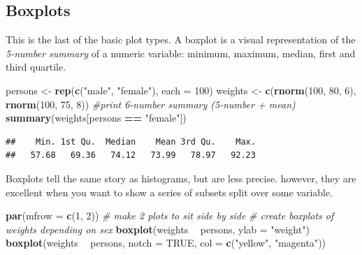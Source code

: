 \documentclass[]{book}
\newenvironment{Shaded}{\begin{snugshade}}{\end{snugshade}}
\newcommand{\CommentTok}[1]{\textcolor[rgb]{0.56,0.35,0.01}{\textit{#1}}}
\newcommand{\DataTypeTok}[1]{\textcolor[rgb]{0.13,0.29,0.53}{#1}}
\newcommand{\DecValTok}[1]{\textcolor[rgb]{0.00,0.00,0.81}{#1}}
\newcommand{\KeywordTok}[1]{\textcolor[rgb]{0.13,0.29,0.53}{\textbf{#1}}}
\newcommand{\NormalTok}[1]{#1}
\newcommand{\OperatorTok}[1]{\textcolor[rgb]{0.81,0.36,0.00}{\textbf{#1}}}
\newcommand{\OtherTok}[1]{\textcolor[rgb]{0.56,0.35,0.01}{#1}}
\newcommand{\StringTok}[1]{\textcolor[rgb]{0.31,0.60,0.02}{#1}}
\begin{document}
\hypertarget{boxplots}{%
\subsection{Boxplots}\label{boxplots}}

This is the last of the basic plot types. A boxplot is a visual representation of the \emph{5-number summary} of a numeric variable: minimum, maximum, median, first and third quartile.

\begin{Shaded}
\begin{Highlighting}[]
\NormalTok{persons <-}\StringTok{ }\KeywordTok{rep}\NormalTok{(}\KeywordTok{c}\NormalTok{(}\StringTok{"male"}\NormalTok{, }\StringTok{"female"}\NormalTok{), }\DataTypeTok{each =} \DecValTok{100}\NormalTok{)}
\NormalTok{weights <-}\StringTok{ }\KeywordTok{c}\NormalTok{(}\KeywordTok{rnorm}\NormalTok{(}\DecValTok{100}\NormalTok{, }\DecValTok{80}\NormalTok{, }\DecValTok{6}\NormalTok{), }\KeywordTok{rnorm}\NormalTok{(}\DecValTok{100}\NormalTok{, }\DecValTok{75}\NormalTok{, }\DecValTok{8}\NormalTok{))}
\CommentTok{#print 6-number summary (5-number + mean)}
\KeywordTok{summary}\NormalTok{(weights[persons }\OperatorTok{==}\StringTok{ "female"}\NormalTok{])}
\end{Highlighting}
\end{Shaded}

\begin{verbatim}
##    Min. 1st Qu.  Median    Mean 3rd Qu.    Max. 
##   57.68   69.36   74.12   73.99   78.97   92.23
\end{verbatim}

Boxplots tell the same story as histograms, but are less precise. however, they are excellent when you want to show a series of subsets split over some variable.

\begin{Shaded}
\begin{Highlighting}[]
\KeywordTok{par}\NormalTok{(}\DataTypeTok{mfrow =} \KeywordTok{c}\NormalTok{(}\DecValTok{1}\NormalTok{, }\DecValTok{2}\NormalTok{)) }\CommentTok{# make 2 plots to sit side by side}
\CommentTok{# create boxplots of weights depending on sex}
\KeywordTok{boxplot}\NormalTok{(weights }\OperatorTok{~}\StringTok{ }\NormalTok{persons, }\DataTypeTok{ylab =} \StringTok{"weight"}\NormalTok{)}
\KeywordTok{boxplot}\NormalTok{(weights }\OperatorTok{~}\StringTok{ }\NormalTok{persons, }\DataTypeTok{notch =} \OtherTok{TRUE}\NormalTok{, }\DataTypeTok{col =} \KeywordTok{c}\NormalTok{(}\StringTok{"yellow"}\NormalTok{, }\StringTok{"magenta"}\NormalTok{))}
\end{Highlighting}
\end{Shaded}
\end{document}
